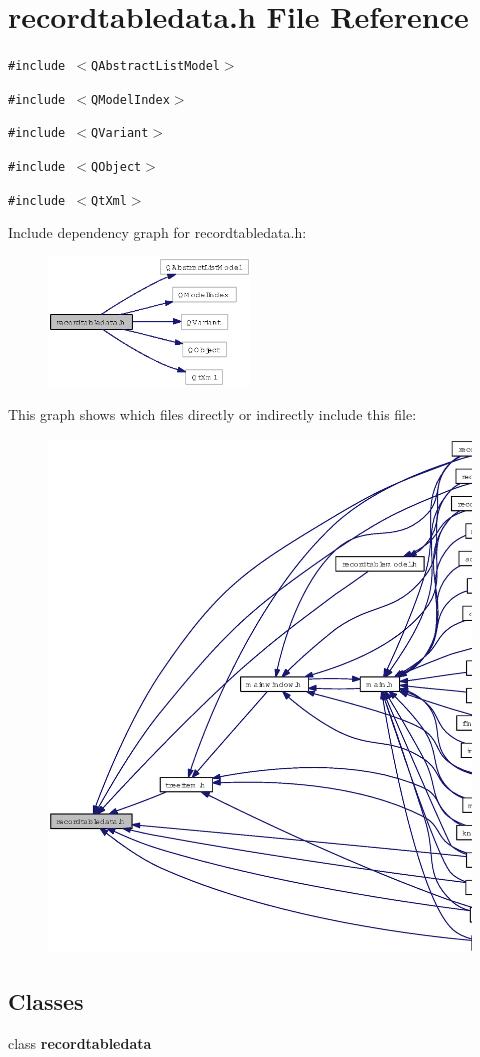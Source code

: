 \section{recordtabledata.h File Reference}
\label{recordtabledata_8h}
{\tt \#include $<$QAbstract\-List\-Model$>$}\par
{\tt \#include $<$QModel\-Index$>$}\par
{\tt \#include $<$QVariant$>$}\par
{\tt \#include $<$QObject$>$}\par
{\tt \#include $<$Qt\-Xml$>$}\par


Include dependency graph for recordtabledata.h:\begin{figure}[H]
\begin{center}
\leavevmode
\includegraphics[width=152pt]{recordtabledata_8h__incl}
\end{center}
\end{figure}


This graph shows which files directly or indirectly include this file:\begin{figure}[H]
\begin{center}
\leavevmode
\includegraphics[width=351pt]{recordtabledata_8h__dep__incl}
\end{center}
\end{figure}
\subsection*{Classes}
\begin{CompactItemize}
\item 
class {\bf recordtabledata}
\end{CompactItemize}
